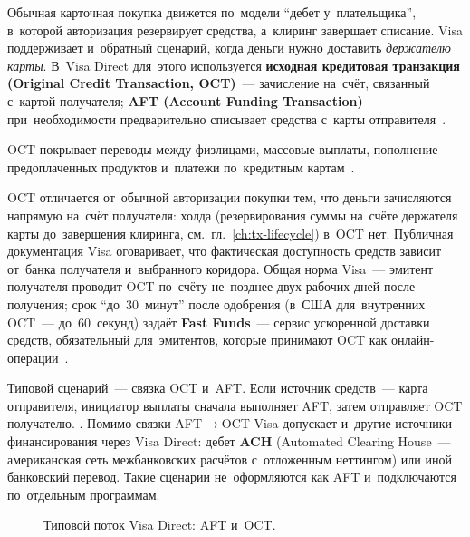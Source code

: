 Обычная карточная покупка движется по~модели \enquote{дебет у~плательщика},
в~которой авторизация резервирует средства, а~клиринг завершает списание. Visa
поддерживает и~обратный сценарий, когда деньги нужно доставить \emph{держателю
карты}. В~Visa Direct для~этого используется \textbf{исходная кредитовая
транзакция (Original Credit Transaction, OCT)}~--- зачисление на~счёт,
связанный с~картой получателя; \textbf{AFT (Account Funding Transaction)}
при~необходимости предварительно списывает средства с~карты
отправителя~\cite{visa-core-rules}.

OCT покрывает переводы между физлицами, массовые выплаты, пополнение
предоплаченных продуктов и~платежи по~кредитным картам~\cite{visa-direct}.

OCT отличается от~обычной авторизации покупки тем, что деньги зачисляются
напрямую на~счёт получателя: холда (резервирования суммы на~счёте держателя
карты до~завершения клиринга, см.~гл.~\ref{ch:tx-lifecycle}) в~OCT нет.
Публичная документация Visa оговаривает, что фактическая доступность средств
зависит от~банка получателя и~выбранного коридора. Общая норма Visa~---
эмитент получателя проводит OCT по~счёту не~позднее двух рабочих дней после
получения; срок \enquote{до~30~минут} после одобрения (в~США для~внутренних
OCT~--- до~60~секунд) задаёт \textbf{Fast Funds}~--- сервис ускоренной
доставки средств, обязательный для~эмитентов, которые принимают OCT
как онлайн-операции~\cite{visa-core-rules}.

Типовой сценарий~--- связка OCT и~AFT. Если источник средств~--- карта
отправителя, инициатор выплаты сначала выполняет AFT, затем отправляет OCT
получателю. . Помимо связки
AFT$\rightarrow$OCT Visa допускает и~другие источники финансирования через Visa
Direct: дебет \textbf{ACH} (Automated Clearing House~--- американская сеть
межбанковских расчётов с~отложенным неттингом) или иной банковский перевод.
Такие сценарии не~оформляются как AFT и~подключаются по~отдельным программам.

\begin{figure}[!ht]
  \centering
  \caption{Типовой поток Visa Direct: AFT и~OCT.}\label{fig:visa-direct-flow}
\end{figure}

